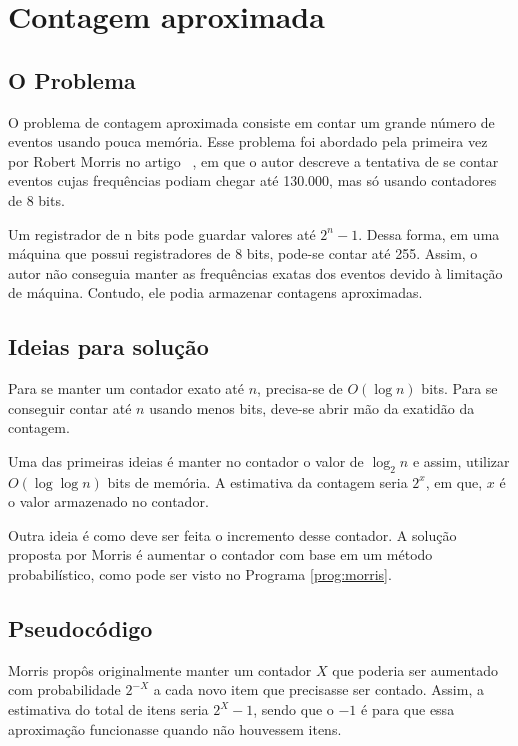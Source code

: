 \chapter{Contagem aproximada}
\label{chap:morris}


\section{O Problema}

O problema de contagem aproximada consiste em contar um grande número de eventos usando pouca memória.  
Esse problema foi abordado pela primeira vez por Robert  Morris no artigo ~\citep{morris:78}, 
em que o autor descreve a tentativa de se contar eventos cujas frequências podiam chegar até 130.000, mas só usando contadores de 8 bits.

Um registrador de n bits pode guardar valores até $2^n-1$. Dessa forma, em uma máquina que possui registradores de 8 bits, pode-se contar até 255.
Assim, o autor não conseguia manter as frequências exatas dos eventos devido à limitação de máquina. 
Contudo, ele podia armazenar contagens aproximadas.


\section{Ideias para solução}

Para se manter um contador exato até $n$, precisa-se de $O(\log n)$ bits. Para se conseguir contar até $n$ usando menos bits, 
deve-se abrir mão da exatidão da contagem. 

Uma das primeiras ideias é manter no contador o valor de $\log_2 n$ e assim, utilizar $O(\log \log n)$ bits de memória. 
A estimativa da contagem seria $2^x$, em que, $x$ é o valor armazenado no contador.

Outra ideia é como deve ser feita o incremento desse contador. 
A solução proposta por Morris é aumentar o contador com base em um método probabilístico, como pode ser visto no Programa \ref{prog:morris}. 


\section{Pseudocódigo}

Morris propôs originalmente manter um contador $X$ que poderia ser aumentado com probabilidade $2^{-X}$ a cada novo item que precisasse ser contado.
Assim, a estimativa do total de itens seria $2^{X} - 1$, sendo que o $-1$ é para que essa aproximação funcionasse quando não houvessem itens.

